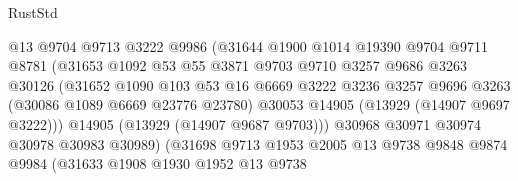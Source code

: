 \begin{lexlean}{RustStd}
\begin{coremodule}
                                @13
                                @9704
                                @9713
                                @3222
                                @9986
                                (@31644
                                  @1900
                                  @1014
                                  @19390
                                  @9704
                                  @9711
                                  @8781
                                  (@31653
                                    @1092
                                    @53
                                    @55
                                    @3871
                                    @9703
                                    @9710
                                    @3257
                                    @9686
                                    @3263
                                    @30126
                                    (@31652
                                      @1090
                                      @103
                                      @53
                                      @16
                                      @6669
                                      @3222
                                      @3236
                                      @3257
                                      @9696
                                      @3263
                                      (@30086 @1089 @6669 @23776 @23780)
                                      @30053
                                      @14905
                                      (@13929 (@14907 @9697 @3222)))
                                    @14905
                                    (@13929 (@14907 @9687 @9703)))
                                  @30968
                                  @30971
                                  @30974
                                  @30978
                                  @30983
                                  @30989)
                                (@31698
                                  @9713
                                  @1953
                                  @2005
                                  @13
                                  @9738
                                  @9848
                                  @9874
                                  @9984
                                  (@31633
                                    @1908
                                    @1930
                                    @1952
                                    @13
                                    @9738

\end{coremodule}
\end{lexlean}
